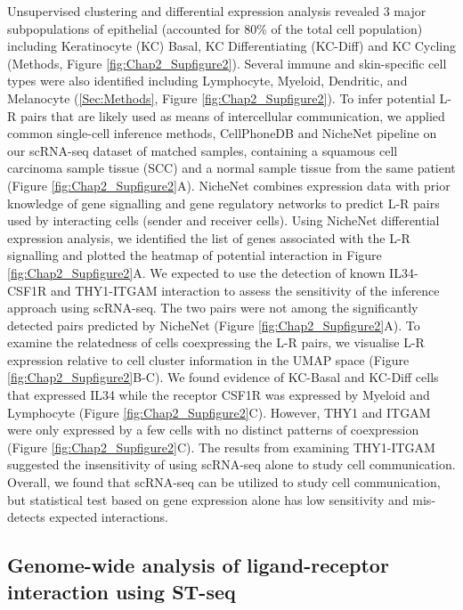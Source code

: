 Unsupervised clustering and differential expression analysis revealed 3 major subpopulations of epithelial (accounted for 80\% of the total cell population) including Keratinocyte (KC) Basal, KC Differentiating (KC-Diff) and KC Cycling (Methods, Figure \ref{fig:Chap2_Supfigure2}). Several immune and skin-specific cell types were also identified including Lymphocyte, Myeloid, Dendritic, and Melanocyte (\ref{Sec:Methods}, Figure \ref{fig:Chap2_Supfigure2}). To infer potential L-R pairs that are likely used as means of intercellular communication, we applied common single-cell inference methods, CellPhoneDB \cite{efremova2020cellphonedb} and NicheNet pipeline \cite{browaeys2020nichenet} on our scRNA-seq dataset of matched samples, containing a squamous cell carcinoma sample tissue (SCC)  and a normal sample tissue from the same patient (Figure \ref{fig:Chap2_Supfigure2}A). NicheNet combines expression data with prior knowledge of gene signalling and gene regulatory networks to predict L-R pairs used by interacting cells (sender and receiver cells).  Using NicheNet differential expression analysis, we identified the list of genes associated with the L-R signalling and plotted the heatmap of potential interaction in  Figure \ref{fig:Chap2_Supfigure2}A. We expected to use the detection of known IL34-CSF1R \cite{lin2008discovery} and THY1-ITGAM \cite{wetzel2004human} interaction to assess the sensitivity of the inference approach using scRNA-seq. The two pairs were not among the significantly detected pairs predicted by NicheNet (Figure \ref{fig:Chap2_Supfigure2}A). To examine the relatedness of cells coexpressing the L-R pairs, we visualise L-R expression relative to cell cluster information in the UMAP space (Figure \ref{fig:Chap2_Supfigure2}B-C). We found evidence of KC-Basal and KC-Diff cells that expressed IL34 while the receptor CSF1R was expressed by Myeloid and Lymphocyte (Figure \ref{fig:Chap2_Supfigure2}C). However, THY1 and ITGAM were only expressed by a few cells with no distinct patterns of coexpression (Figure \ref{fig:Chap2_Supfigure2}C). The results from examining THY1-ITGAM suggested the insensitivity of using scRNA-seq alone to study cell communication. Overall, we found that scRNA-seq can be utilized to study cell communication, but statistical test based on gene expression alone has low sensitivity and mis-detects expected interactions.  

\subsection{Genome-wide analysis of ligand-receptor interaction using ST-seq}

